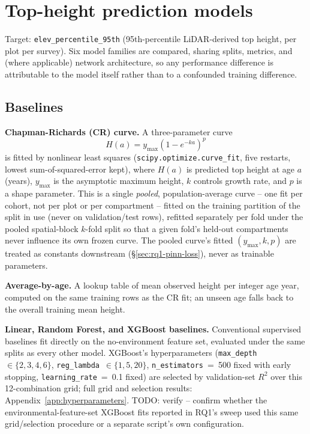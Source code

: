 \section{Top-height prediction models}
\label{sec:rq1}
\label{sec:rq1-pinn}

Target: \texttt{elev\_percentile\_95th} (95th-percentile LiDAR-derived top height, per plot per
survey). Six model families are compared, sharing splits, metrics, and (where applicable) network
architecture, so any performance difference is attributable to the model itself rather than to a
confounded training difference.

\subsection{Baselines}

\textbf{Chapman-Richards (CR) curve.} A three-parameter curve
\begin{equation}
H(a) = y_{\max}\left(1-e^{-ka}\right)^{p}
\label{eq:cr}
\end{equation}
is fitted by nonlinear least squares (\texttt{scipy.optimize.curve\_fit}, five restarts, lowest
sum-of-squared-error kept), where $H(a)$ is predicted top height at age $a$ (years), $y_{\max}$ is
the asymptotic maximum height, $k$ controls growth rate, and $p$ is a shape parameter. This is a
single \emph{pooled}, population-average curve -- one fit per cohort, not per plot or per
compartment -- fitted on the training partition of the split in use (never on validation/test
rows), refitted separately per fold under the pooled spatial-block $k$-fold split so that a given
fold's held-out compartments never influence its own frozen curve. The pooled curve's fitted
$(y_{\max},k,p)$ are treated as constants downstream (\S\ref{sec:rq1-pinn-loss}), never as
trainable parameters.

\textbf{Average-by-age.} A lookup table of mean observed height per integer age year, computed on
the same training rows as the CR fit; an unseen age falls back to the overall training mean
height.

\textbf{Linear, Random Forest, and XGBoost baselines.} Conventional supervised baselines fit
directly on the no-environment feature set, evaluated under the same splits as every other model.
XGBoost's hyperparameters (\texttt{max\_depth}~$\in\{2,3,4,6\}$,
\texttt{reg\_lambda}~$\in\{1,5,20\}$, \texttt{n\_estimators}~=~500 fixed with early stopping,
\texttt{learning\_rate}~=~0.1 fixed) are selected by validation-set $R^2$ over this 12-combination
grid; full grid and selection results: Appendix~\ref{app:hyperparameters}. %
TODO: verify -- confirm whether the environmental-feature-set XGBoost fits reported in RQ1's
sweep used this same grid/selection procedure or a separate script's own configuration.

